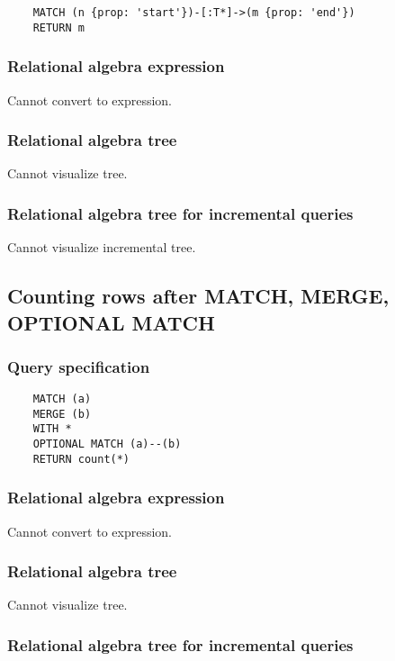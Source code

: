 	\begin{lstlisting}
	MATCH (n {prop: 'start'})-[:T*]->(m {prop: 'end'})
	RETURN m
	\end{lstlisting}


	\subsubsection*{Relational algebra expression}

	Cannot convert to expression.

	\subsubsection*{Relational algebra tree}

	Cannot visualize tree.

	\subsubsection*{Relational algebra tree for incremental queries}

	Cannot visualize incremental tree.
	\subsection{Counting rows after MATCH, MERGE, OPTIONAL MATCH}

	\subsubsection*{Query specification}

	\begin{lstlisting}
	MATCH (a)
	MERGE (b)
	WITH *
	OPTIONAL MATCH (a)--(b)
	RETURN count(*)
	\end{lstlisting}


	\subsubsection*{Relational algebra expression}

	Cannot convert to expression.

	\subsubsection*{Relational algebra tree}

	Cannot visualize tree.

	\subsubsection*{Relational algebra tree for incremental queries}

